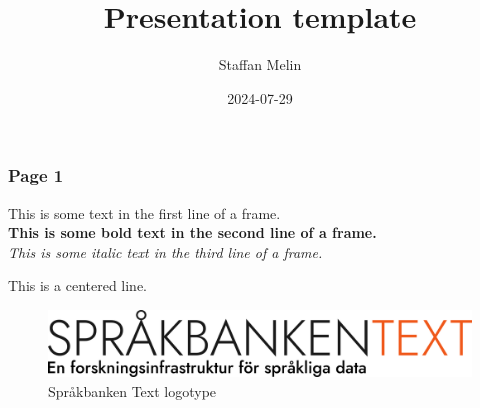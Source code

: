 \documentclass{beamer}
\title{Presentation template}
\author{Staffan Melin}
\institute{Språkbanken Text}
\date{2024-07-29}
\begin{document}

\frame{\titlepage}


\begin{frame}
\frametitle{Page 1}

This is some text in the first line of a frame.\\

\textbf{This is some bold text in the second line of a frame.}\\

\textit{This is some italic text in the third line of a frame.}

\begin{center}
This is a centered line.
\end{center}

\begin{figure}
    \centering
    \includegraphics{images/sprakbanken_text_slogan.png}
    \caption{Språkbanken Text logotype}
    \label{fig:Språkbanken Text}
\end{figure}

\end{frame}
\end{document}
